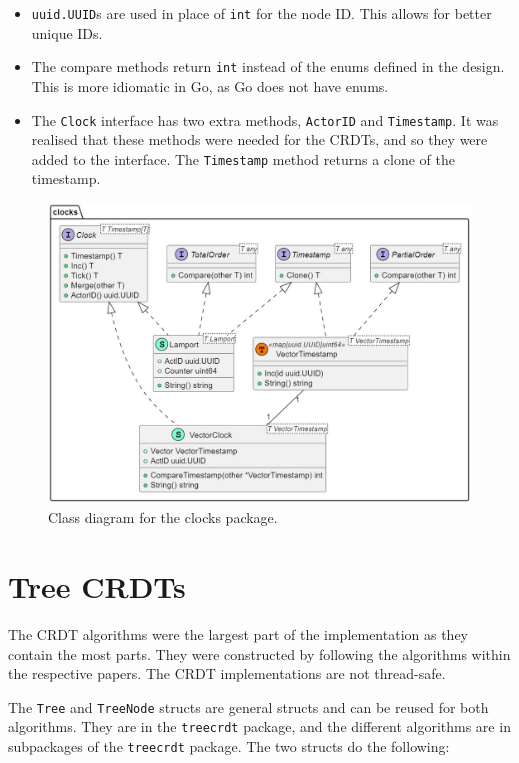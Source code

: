 \documentclass[12pt]{report}
\begin{document}
\begin{itemize}
    \item \texttt{uuid.UUID}s are used in place of \texttt{int} for the node ID. This allows for better unique IDs.
    \item The compare methods return \texttt{int} instead of the enums defined in the design. This is more idiomatic in Go, as Go does not have enums.
    \item The \texttt{Clock} interface has two extra methods, \texttt{ActorID} and \texttt{Timestamp}. It was realised that these methods were needed for the CRDTs, and so they were added to the interface. The \texttt{Timestamp} method returns a clone of the timestamp.
\end{itemize}

\begin{figure}[h]
    \centering
    \includegraphics[width=1\textwidth]{images/clocks_impl.jpg}
    \caption{Class diagram for the clocks package.}
    \label{fig:clockimpl}
\end{figure}


\section{Tree CRDTs}
The CRDT algorithms were the largest part of the implementation as they contain the most parts. They were constructed by following the algorithms within the respective papers. The CRDT implementations are not thread-safe.

The \texttt{Tree} and \texttt{TreeNode} structs are general structs and can be reused for both algorithms. They are in the \texttt{treecrdt} package, and the different algorithms are in subpackages of the \texttt{treecrdt} package. The two structs do the following: 
\end{document}
